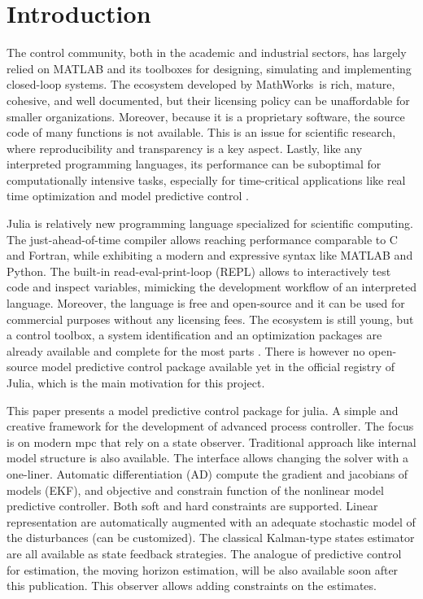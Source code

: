 \section{Introduction}

The control community, both in the academic and industrial sectors, has largely relied on MATLAB and its toolboxes for designing, simulating and implementing closed-loop systems. The ecosystem developed by MathWorks\texttrademark\ is rich, mature, cohesive, and well documented, but their licensing policy can be unaffordable for smaller organizations. Moreover, because it is a proprietary software, the source code of many functions is not available. This is an issue for scientific research, where reproducibility and transparency is a key aspect. Lastly, like any interpreted programming languages, its performance can be suboptimal for computationally intensive tasks, especially for time-critical applications like real time optimization and model predictive control \citep{matlabPythonJulia}.

Julia is relatively new programming language specialized for scientific computing. The just-ahead-of-time compiler allows reaching performance comparable to C and Fortran, while exhibiting a modern and expressive syntax like MATLAB and Python. The built-in read-eval-print-loop (REPL) allows to interactively test code and inspect variables, mimicking the development workflow of an interpreted language. Moreover, the language is free and open-source and it can be used for commercial purposes without any licensing fees. The ecosystem is still young, but a control toolbox, a system identification and an optimization packages are already available and complete for the most parts \citep{controlsystems_jl, jump_jl}. There is however no open-source model predictive control package available yet in the official registry of Julia, which is the main motivation for this project.

This paper presents a model predictive control package for julia. A simple and creative framework for the development of advanced process controller. The focus is on modern mpc that rely on a state observer. Traditional approach like internal model structure is also available. The  interface allows changing the solver with a one-liner. Automatic differentiation (AD) compute the gradient and jacobians of models (EKF), and objective and constrain function of the nonlinear model predictive controller. Both soft and hard constraints are supported. Linear representation are automatically augmented with an adequate stochastic model of the disturbances (can be customized). The classical Kalman-type states estimator are all available as state feedback strategies. The analogue of predictive control for estimation, the moving horizon estimation, will be also available soon after this publication. This observer allows adding constraints on the estimates. 

